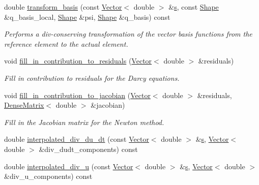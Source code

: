 \begin{DoxyCompactItemize}
double \hyperlink{classoomph_1_1AxisymmetricPoroelasticityEquations_a1099fdce51f4b25e69e89a8b46c12a43}{transform\+\_\+basis} (const \hyperlink{classoomph_1_1Vector}{Vector}$<$ double $>$ \&\hyperlink{cfortran_8h_ab7123126e4885ef647dd9c6e3807a21c}{s}, const \hyperlink{classoomph_1_1Shape}{Shape} \&q\+\_\+basis\+\_\+local, \hyperlink{classoomph_1_1Shape}{Shape} \&psi, \hyperlink{classoomph_1_1Shape}{Shape} \&q\+\_\+basis) const
\begin{DoxyCompactList}\small\item\em Performs a div-\/conserving transformation of the vector basis functions from the reference element to the actual element. \end{DoxyCompactList}\item 
void \hyperlink{classoomph_1_1AxisymmetricPoroelasticityEquations_a4a1d80c71b37ee839c6f7fde6bb0b8bf}{fill\+\_\+in\+\_\+contribution\+\_\+to\+\_\+residuals} (\hyperlink{classoomph_1_1Vector}{Vector}$<$ double $>$ \&residuals)
\begin{DoxyCompactList}\small\item\em Fill in contribution to residuals for the Darcy equations. \end{DoxyCompactList}\item 
void \hyperlink{classoomph_1_1AxisymmetricPoroelasticityEquations_ae9ce19fe1b4cb1556408b4e2d3efaf76}{fill\+\_\+in\+\_\+contribution\+\_\+to\+\_\+jacobian} (\hyperlink{classoomph_1_1Vector}{Vector}$<$ double $>$ \&residuals, \hyperlink{classoomph_1_1DenseMatrix}{Dense\+Matrix}$<$ double $>$ \&jacobian)
\begin{DoxyCompactList}\small\item\em Fill in the Jacobian matrix for the Newton method. \end{DoxyCompactList}\item 
double \hyperlink{classoomph_1_1AxisymmetricPoroelasticityEquations_ab13e72b1a71a8a2d3dde4290e6404fb2}{interpolated\+\_\+div\+\_\+du\+\_\+dt} (const \hyperlink{classoomph_1_1Vector}{Vector}$<$ double $>$ \&\hyperlink{cfortran_8h_ab7123126e4885ef647dd9c6e3807a21c}{s}, \hyperlink{classoomph_1_1Vector}{Vector}$<$ double $>$ \&div\+\_\+dudt\+\_\+components) const
\item 
double \hyperlink{classoomph_1_1AxisymmetricPoroelasticityEquations_a45820f816533341e6def9edf32fcc055}{interpolated\+\_\+div\+\_\+u} (const \hyperlink{classoomph_1_1Vector}{Vector}$<$ double $>$ \&\hyperlink{cfortran_8h_ab7123126e4885ef647dd9c6e3807a21c}{s}, \hyperlink{classoomph_1_1Vector}{Vector}$<$ double $>$ \&div\+\_\+u\+\_\+components) const

\end{DoxyCompactItemize}
